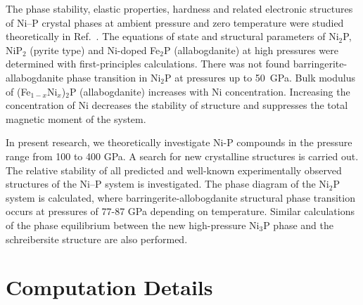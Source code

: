 \documentclass[twoside,twocolumn,9pt]{article}
\begin{document}
The phase stability, elastic properties, hardness and related electronic structures of Ni--P crystal phases at ambient pressure and zero temperature were studied theoretically in Ref.~\cite{Chen-2016-PhaseTrans, Zhao2011-CALPHAD}. 
The equations of state and structural parameters of Ni$_2$P, NiP$_2$ (pyrite type) and Ni-doped Fe$_2$P (allabogdanite) at high pressures were determined with first-principles calculations.\cite{Nisar-2010-EPSL}
There was not found barringerite-allabogdanite phase transition in Ni$_2$P at pressures up to 50~GPa. 
Bulk modulus of (Fe$_{1-x}$Ni$_x$)$_2$P (allabogdanite) increases with Ni concentration. 
Increasing the concentration of Ni decreases the stability of structure and suppresses the total magnetic moment of the system. 

In present research, we theoretically investigate Ni-P compounds in the pressure range from 100 to 400 GPa. 
A search for new crystalline structures is carried out.
The relative stability of all predicted and well-known experimentally observed structures of the Ni--P system is investigated. 
The phase diagram of the Ni$_2$P system is calculated, where barringerite-allobogdanite structural phase transition occurs at pressures of 77-87 GPa depending on temperature. 
Similar calculations of the phase equilibrium between the new high-pressure Ni$_3$P phase and the schreibersite structure are also performed.



   


\section{Computation Details}
\end{document}
